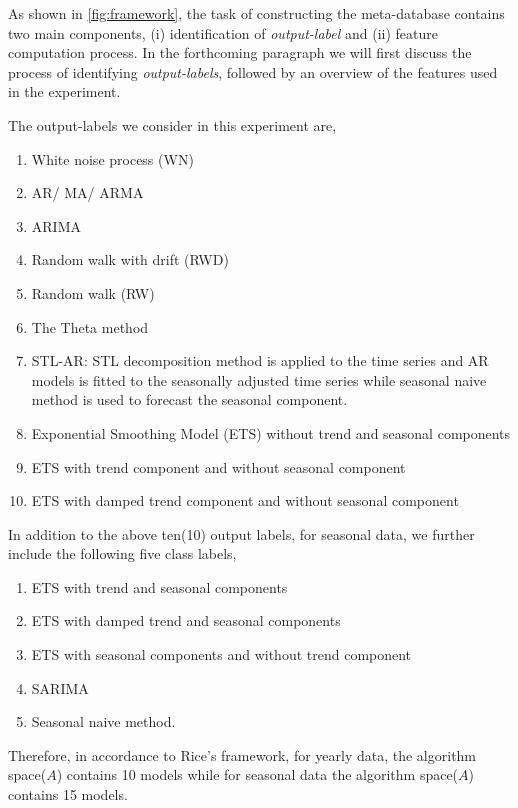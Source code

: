\documentclass[11pt,a4paper,]{article}
\theoremstyle{definition}
\theoremstyle{definition}
\theoremstyle{definition}
\theoremstyle{remark}
\begin{document}
As shown in \autoref{fig:framework}, the task of constructing the
meta-database contains two main components, (i) identification of
\emph{output-label} and (ii) feature computation process. In the
forthcoming paragraph we will first discuss the process of identifying
\emph{output-labels}, followed by an overview of the features used in
the experiment.

The output-labels we consider in this experiment are,

\begin{enumerate}
\def\labelenumi{\roman{enumi})}
\item
  White noise process (WN)
\item
  AR/ MA/ ARMA
\item
  ARIMA
\item
  Random walk with drift (RWD)
\item
  Random walk (RW)
\item
  The Theta method
\item
  STL-AR: STL decomposition method is applied to the time series and AR
  models is fitted to the seasonally adjusted time series while seasonal
  naive method is used to forecast the seasonal component.
\item
  Exponential Smoothing Model (ETS) without trend and seasonal
  components
\item
  ETS with trend component and without seasonal component
\item
  ETS with damped trend component and without seasonal component
\end{enumerate}

In addition to the above ten(10) output labels, for seasonal data, we
further include the following five class labels,

\begin{enumerate}
\def\labelenumi{\roman{enumi})}
\setcounter{enumi}{10}
\item
  ETS with trend and seasonal components
\item
  ETS with damped trend and seasonal components
\item
  ETS with seasonal components and without trend component
\item
  SARIMA
\item
  Seasonal naive method.
\end{enumerate}

Therefore, in accordance to Rice's framework, for yearly data, the
algorithm space(\(A\)) contains 10 models while for seasonal data the
algorithm space(\(A\)) contains 15 models.
\end{document}
